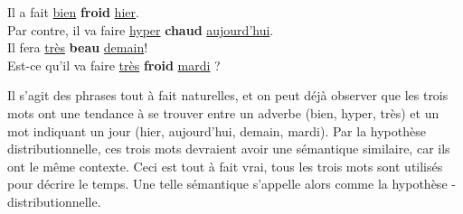 \documentclass[11pt, a4paper]{report}
\begin{document}
\begin{center}
  Il a fait \underline{bien} \textbf{froid} \underline{hier}. \\
  Par contre, il va faire \underline{hyper} \textbf{chaud} \underline{aujourd'hui}. \\
  Il fera \underline{très} \textbf{beau} \underline{demain}! \\
  Est-ce qu'il va faire \underline{très} \textbf{froid} \underline{mardi} ?
\end{center}

Il s'agit des phrases tout à fait naturelles, et on peut déjà observer que les trois mots 
ont une tendance à se trouver entre un adverbe (bien, hyper, très) et un mot indiquant 
un jour (hier, aujourd'hui, demain, mardi). Par la hypothèse distributionnelle, ces trois mots 
devraient avoir une sémantique similaire, car ils ont le même 
contexte. Ceci est tout à fait vrai, tous les trois mots sont utilisés pour décrire le temps. 
Une telle sémantique s'appelle alors comme la hypothèse - distributionnelle. 
\end{document}
